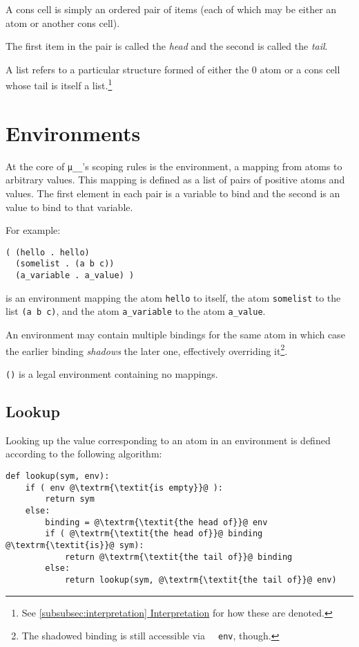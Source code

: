 \documentclass[twocolumn]{report}
\newcommand\muu{\texttt{μ\!\!\!\_\_}}
\newcommand{\intralink}[2]{\hyperref[#1]{\ref*{#1} #2}}
\begin{document}
A cons cell is simply an ordered pair of items (each of which may be either an atom or another cons cell).

The first item in the pair is called the \emph{head} and the second is called the \emph{tail}.

A list refers to a particular structure formed of either the $0$ atom or a cons cell whose tail is itself a list.\footnote{See \intralink{subsubsec:interpretation}{Interpretation} for how these are denoted.}

\section{Environments}
\label{sec:environments}

At the core of \muu's scoping rules is the environment, a mapping from atoms to arbitrary values. This mapping is defined as a list of pairs of positive atoms and values. The first element in each pair is a variable to bind and the second is an value to bind to that variable.

For example:
\begin{verbatim}
( (hello . hello)
  (somelist . (a b c))
  (a_variable . a_value) )
\end{verbatim}
is an environment mapping the atom \texttt{hello} to itself, the atom \texttt{somelist} to the list \texttt{(a b c)}, and the atom \texttt{a_variable} to the atom \texttt{a_value}.

An environment may contain multiple bindings for the same atom in which case the earlier binding \emph{shadows} the later one, effectively overriding it\footnote{The shadowed binding is still accessible via \texttt{~~env}, though.}.

\texttt{()} is a legal environment containing no mappings.

\subsection{Lookup}
\label{subsec:lookup}

Looking up the value corresponding to an atom in an environment is defined according to the following algorithm:
\begin{verbatim}
def lookup(sym, env):
    if ( env @\textrm{\textit{is empty}}@ ):
        return sym
    else:
        binding = @\textrm{\textit{the head of}}@ env
        if ( @\textrm{\textit{the head of}}@ binding @\textrm{\textit{is}}@ sym):
            return @\textrm{\textit{the tail of}}@ binding
        else:
            return lookup(sym, @\textrm{\textit{the tail of}}@ env)
\end{verbatim}
\end{document}

